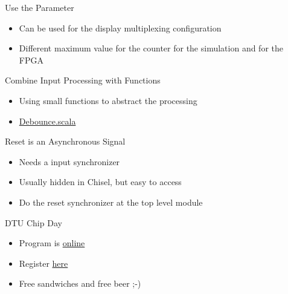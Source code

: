 \begin{frame}[fragile]{Use the Parameter}
\begin{itemize}
\item Can be used for the display multiplexing configuration
\item Different maximum value for the counter for the simulation and for the FPGA
\end{itemize}
\end{frame}


\begin{frame}[fragile]{Combine Input Processing with Functions}
\begin{itemize}
\item Using small functions to abstract the processing
\item \href{https://github.com/schoeberl/chisel-book/blob/master/src/main/scala/Debounce.scala}{Debounce.scala}
\end{itemize}
\end{frame}

\begin{frame}[fragile]{Reset is an Asynchronous Signal}
\begin{itemize}
\item Needs a input synchronizer
\item Usually hidden in Chisel, but easy to access
\item Do the reset synchronizer at the top level module
\end{itemize}
\end{frame}

\begin{frame}[fragile]{DTU Chip Day}
\begin{itemize}
\item Program is \href{https://dtu.events/dtuchipday2024/agenda}{online}
\item Register \href{https://dtu.events/dtuchipday2024/signup}{here}
\item Free sandwiches and free beer ;-)
\end{itemize}
\end{frame}

